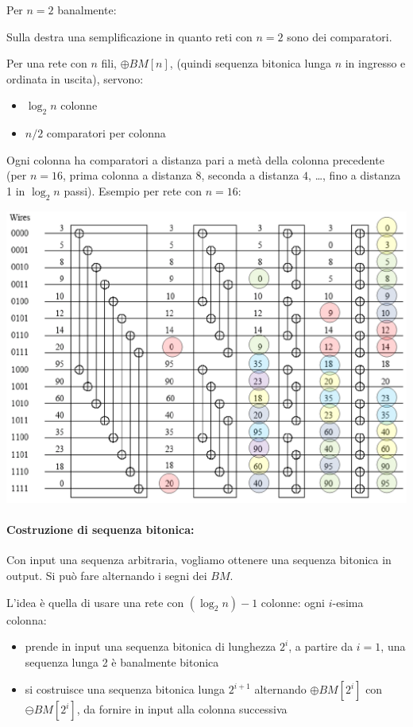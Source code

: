Per $n = 2$ banalmente:
\begin{center}
    
    
\end{center}

\begin{center}
    
    
\end{center}

Sulla destra una semplificazione in quanto reti con $n = 2$ sono dei comparatori.

Per una rete con $n$ fili, $\oplus BM [n]$, (quindi sequenza bitonica lunga $n$ in ingresso e ordinata in uscita), servono: 
\begin{itemize}
    \item $\log_2 n$ colonne
    \item $n/2$ comparatori per colonna
\end{itemize}

Ogni colonna ha comparatori a distanza pari a metà della colonna precedente (per $n=16$, prima colonna a distanza $8$, seconda a distanza $4$, \dots, fino a distanza 1 in $\log_2 n$ passi). Esempio per rete con $n = 16$:
\begin{center}
    \includegraphics[width=0.79\columnwidth]{img/pattern/n16}
\end{center}

\paragraph{Costruzione di sequenza bitonica:} Con input una sequenza arbitraria, vogliamo ottenere una sequenza bitonica in output. Si può fare alternando i segni dei $BM$.

L'idea è quella di usare una rete con $(\log_2 n) - 1$ colonne: ogni $i$-esima colonna:
\begin{itemize}
    \item prende in input una sequenza bitonica di lunghezza $2^i$, a partire da $i=1$, una sequenza lunga 2 è banalmente bitonica
    
    \item si costruisce una sequenza bitonica lunga $2^{i+1}$ alternando $\oplus BM[2^i]$ con $\ominus BM[2^i]$, da fornire in input alla colonna successiva
\end{itemize}

